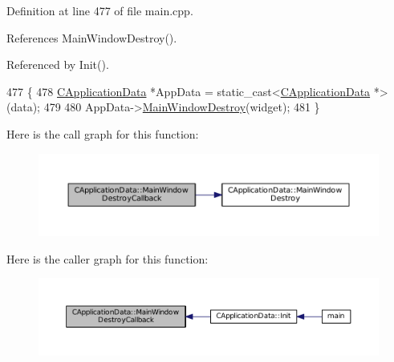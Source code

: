 Definition at line 477 of file main.\+cpp.



References Main\+Window\+Destroy().



Referenced by Init().


\begin{DoxyCode}
477                                                                                 \{
478     \hyperlink{classCApplicationData}{CApplicationData} *AppData = \textcolor{keyword}{static\_cast<}\hyperlink{classCApplicationData}{CApplicationData} *\textcolor{keyword}{>}(data);
479 
480     AppData->\hyperlink{classCApplicationData_a202437b2380956a5519722937cd9f96a}{MainWindowDestroy}(widget);
481 \}
\end{DoxyCode}
Here is the call graph for this function\+:\nopagebreak
\begin{figure}[H]
\begin{center}
\leavevmode
\includegraphics[width=350pt]{classCApplicationData_a379327c78dc57aa9dcef77e1b98efa2d_cgraph}
\end{center}
\end{figure}
Here is the caller graph for this function\+:\nopagebreak
\begin{figure}[H]
\begin{center}
\leavevmode
\includegraphics[width=350pt]{classCApplicationData_a379327c78dc57aa9dcef77e1b98efa2d_icgraph}
\end{center}
\end{figure}
\hypertarget{classCApplicationData_a9b451765c93ecf00322f5450d29bfffe}{}\label{classCApplicationData_a9b451765c93ecf00322f5450d29bfffe} 
